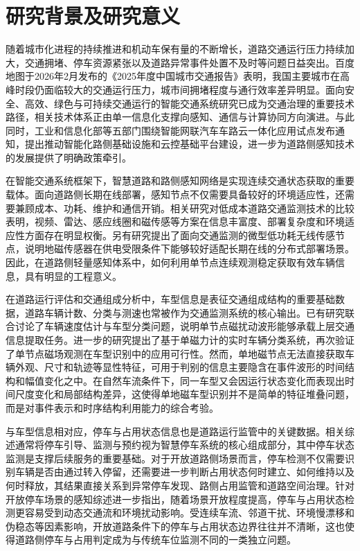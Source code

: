 \documentclass{xdupgthesis}
\begin{document}
\section{研究背景及研究意义}
\label{sec:intro_background}

随着城市化进程的持续推进和机动车保有量的不断增长，道路交通运行压力持续加大，交通拥堵、停车资源紧张以及道路异常事件处置不及时等问题日益突出。百度地图于2026年2月发布的《2025年度中国城市交通报告》表明，我国主要城市在高峰时段仍面临较大的交通运行压力，城市间拥堵程度与通行效率差异明显\cite{R02}。面向安全、高效、绿色与可持续交通运行的智能交通系统研究已成为交通治理的重要技术路径，相关技术体系正由单一信息化支撑向感知、通信与计算协同方向演进\cite{wang2023transportation5}。与此同时，工业和信息化部等五部门围绕智能网联汽车车路云一体化应用试点发布通知，提出推动智能化路侧基础设施和云控基础平台建设，进一步为道路侧感知技术的发展提供了明确政策牵引\cite{R01}。

在智能交通系统框架下，智慧道路和路侧感知网络是实现连续交通状态获取的重要载体。面向道路侧长期在线部署，感知节点不仅需要具备较好的环境适应性，还需要兼顾成本、功耗、维护和通信开销。相关研究对低成本道路交通监测技术的比较表明，视频、雷达、感应线圈和磁传感等方案在信息丰富度、部署复杂度和环境适应性方面存在明显权衡\cite{ch2_bernas2018lowcost}。另有研究提出了面向交通监测的微型低功耗无线传感节点，说明地磁传感器在供电受限条件下能够较好适配长期在线的分布式部署场景\cite{chovanec2014tinywsn}。因此，在道路侧轻量感知体系中，如何利用单节点连续观测稳定获取有效车辆信息，具有明显的工程意义。

在道路运行评估和交通组成分析中，车型信息是表征交通组成结构的重要基础数据，道路车辆计数、分类与测速也常被作为交通监测系统的核心输出\cite{taghvaeeyan2014portable}。已有研究联合讨论了车辆速度估计与车型分类问题，说明单节点磁扰动波形能够承载上层交通信息提取任务\cite{feng2022magmonitor}。进一步的研究提出了基于单磁力计的实时车辆分类系统，再次验证了单节点磁场观测在车型识别中的应用可行性\cite{ch3_sarcevic2022singlemag}。然而，单地磁节点无法直接获取车辆外观、尺寸和轨迹等显性特征，可用于判别的信息主要隐含在事件波形的时间结构和幅值变化之中。在自然车流条件下，同一车型又会因运行状态变化而表现出时间尺度变化和局部结构差异，这使得单地磁车型识别并不是简单的特征堆叠问题，而是对事件表示和时序结构利用能力的综合考验。

与车型信息相对应，停车与占用状态信息也是道路运行监管中的关键数据。相关综述通常将停车引导、监测与预约视为智慧停车系统的核心组成部分，其中停车状态监测是支撑后续服务的重要基础\cite{kotb2017smartparking}。对于开放道路侧场景而言，停车检测不仅需要识别车辆是否由通过转入停留，还需要进一步判断占用状态何时建立、如何维持以及何时释放，其结果直接关系到异常停车发现、路侧占用监管和道路空间治理。针对开放停车场景的感知综述进一步指出，随着场景开放程度提高，停车与占用状态检测更容易受到动态交通流和环境扰动影响\cite{R52}。受连续车流、邻道干扰、环境慢漂移和伪稳态等因素影响，开放道路条件下的停车与占用状态边界往往并不清晰，这也使得道路侧停车与占用判定成为与传统车位监测不同的一类独立问题。
\end{document}

